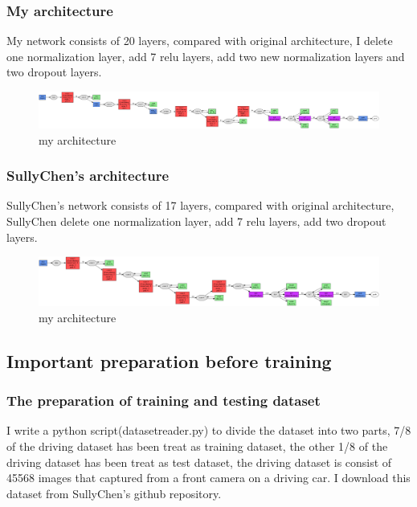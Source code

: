 \documentclass[10pt,twocolumn,letterpaper]{article}
\begin{document}
\subsubsection{My architecture}


My network consists of 20 layers, compared with original architecture, I delete one normalization layer, add 7 relu layers, add two new normalization layers and two dropout layers.



\begin{figure}[h]
	\begin{center}
		
		\includegraphics[width=0.8\linewidth]{pilotnet_deploy_my.png}
	\end{center}
	\caption{my architecture}
	\label{fig:long2}
	\label{fig:onecol2}
\end{figure}


\subsubsection{SullyChen's architecture}


SullyChen's network consists of 17 layers, compared with original architecture, SullyChen delete one normalization layer, add 7 relu layers, add two dropout layers.



\begin{figure}[h]
	\begin{center}
		
		\includegraphics[width=0.8\linewidth]{pilotnet_deploy_s.png}
	\end{center}
	\caption{my architecture}
	\label{fig:long3}
	\label{fig:onecol3}
\end{figure}
\subsection{Important preparation before training}

\subsubsection{The preparation of training and testing dataset}
I write a python script(datasetreader.py) to divide the dataset into two parts, 7/8 of the driving dataset has been treat as training dataset, the other 1/8 of the driving dataset has been treat as test dataset, the driving dataset is consist of 45568 images that captured from a front camera on a driving car. I download this dataset from SullyChen's github repository.
\end{document}
